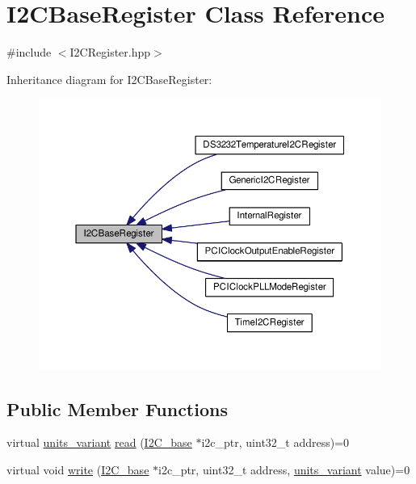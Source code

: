 \hypertarget{class_i2_c_base_register}{}\section{I2\+C\+Base\+Register Class Reference}
\label{class_i2_c_base_register}


{\ttfamily \#include $<$I2\+C\+Register.\+hpp$>$}



Inheritance diagram for I2\+C\+Base\+Register\+:
\nopagebreak
\begin{figure}[H]
\begin{center}
\leavevmode
\includegraphics[width=350pt]{class_i2_c_base_register__inherit__graph}
\end{center}
\end{figure}
\subsection*{Public Member Functions}
\begin{DoxyCompactItemize}
\item 
virtual \hyperlink{units__define_8hpp_a95d46867fa79633565c288a0b4bd5408}{units\+\_\+variant} \hyperlink{class_i2_c_base_register_a947d834a745d3036c4cd8a2d5e19cd0d}{read} (\hyperlink{class_i2_c__base}{I2\+C\+\_\+base} $\ast$i2c\+\_\+ptr, uint32\+\_\+t address)=0
\item 
virtual void \hyperlink{class_i2_c_base_register_ad3f9f1404fe6af3e10e8f204b16d2066}{write} (\hyperlink{class_i2_c__base}{I2\+C\+\_\+base} $\ast$i2c\+\_\+ptr, uint32\+\_\+t address, \hyperlink{units__define_8hpp_a95d46867fa79633565c288a0b4bd5408}{units\+\_\+variant} value)=0
\end{DoxyCompactItemize}
